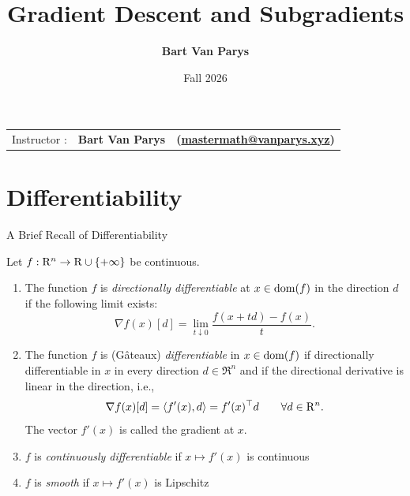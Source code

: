 \documentclass[9pt]{beamer}
\title[Continuous Optimization]{Gradient Descent and Subgradients}
\author[]{\textbf{Bart Van Parys}}
\date[]{Fall 2026}
\begin{document}
\begin{frame}  

  \maketitle

  \vspace{-2em}
  
    \begin{center}
    \begin{tabular}{lll}
      Instructor : & \textbf{Bart Van Parys} & \textbf{(\href{mailto:mastermath@vanparys.xyz}{mastermath@vanparys.xyz})} \\
    \end{tabular}
  \end{center}
  
\end{frame}

\section{Differentiability}

\begin{frame}{A Brief Recall of Differentiability}


  Let $f:\mathrm{R}^n\to\mathrm{R}\cup\{+\infty\}$ be continuous.

  \begin{enumerate}
    \setlength\itemsep{2em}
  \item The function $f$ is \emph{directionally differentiable} at $x \in \operatorname{dom}(f)$ in the direction $d$ if the following limit exists:
    \[
      \nabla f(x)[d] = \lim_{t\downarrow 0} \frac{f(x+t d)-f(x)}{t}.
    \]
  \item<2-> The function $f$ is (G\^ateaux) \emph{differentiable} in $x \in \operatorname{dom}(f)$ if directionally differentiable in $x$ in every direction $d \in \Re^n$ and if the directional derivative is linear in the direction, i.e.,
    \[
      \nabla f(x)[d] = \left<f'(x), d\right> = f'(x)^\top d  \qquad\forall d \in \mathrm{R}^n.
    \]
    The vector $f'(x)$ is called the gradient at $x$.
  \item<3-> $f$ is \emph{continuously differentiable} if $x \mapsto f'(x)$ is continuous

  \item<4-> $f$ is \emph{smooth} if $x \mapsto f'(x)$ is Lipschitz
  \end{enumerate}
  
  
\end{frame}
\end{document}
